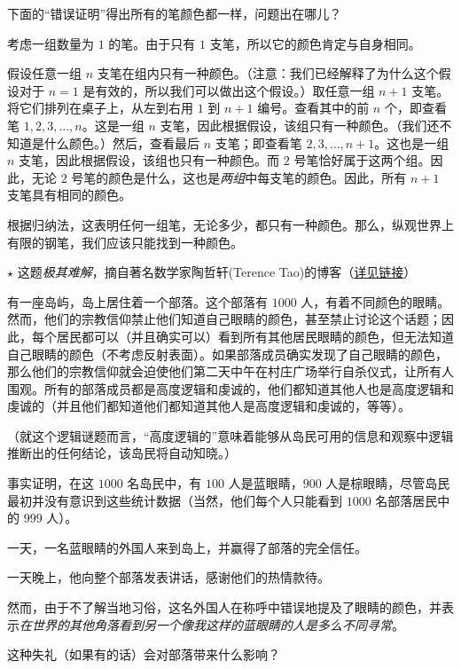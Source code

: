 \clearpage

\begin{exercise}
    下面的“错误证明”得出所有的笔颜色都一样，问题出在哪儿？
    \begin{spoof}
        考虑一组数量为 $1$ 的笔。由于只有 $1$ 支笔，所以它的颜色肯定与自身相同。

        假设任意一组 $n$ 支笔在组内只有一种颜色。（注意：我们已经解释了为什么这个假设对于 $n = 1$ 是有效的，所以我们可以做出这个假设。）取任意一组 $n + 1$ 支笔。将它们排列在桌子上，从左到右用 $1$ 到 $n + 1$ 编号。查看其中的前 $n$ 个，即查看笔 $1,2,3, \dots , n$。这是一组 $n$ 支笔，因此根据假设，该组只有一种颜色。（我们还不知道是什么颜色。）然后，查看最后 $n$ 支笔；即查看笔 $2,3, \dots ,n+1$。这也是一组 $n$ 支笔，因此根据假设，该组也只有一种颜色。而 $2$ 号笔恰好属于这两个组。因此，无论 $2$ 号笔的颜色是什么，这也是\textit{两组}中每支笔的颜色。因此，所有 $n+1$ 支笔具有相同的颜色。

        根据归纳法，这表明任何一组笔，无论多少，都只有一种颜色。那么，纵观世界上有限的钢笔，我们应该只能找到一种颜色。
    \end{spoof}
\end{exercise}

\begin{exercise}
    $\star$ 这题\textit{极其难解}，摘自著名数学家陶哲轩(Terence Tao)的博客（\href{https://terrytao.wordpress.com/2011/04/07/the-blue-eyed-islanders-puzzle-repost/}{详见链接}）

    有一座岛屿，岛上居住着一个部落。这个部落有 $1000$ 人，有着不同颜色的眼睛。然而，他们的宗教信仰禁止他们知道自己眼睛的颜色，甚至禁止讨论这个话题；因此，每个居民都可以（并且确实可以）看到所有其他居民眼睛的颜色，但无法知道自己眼睛的颜色（不考虑反射表面）。如果部落成员确实发现了自己眼睛的颜色，那么他们的宗教信仰就会迫使他们第二天中午在村庄广场举行自杀仪式，让所有人围观。所有的部落成员都是高度逻辑和虔诚的，他们都知道其他人也是高度逻辑和虔诚的（并且他们都知道他们都知道其他人是高度逻辑和虔诚的，等等）。

    （就这个逻辑谜题而言，“高度逻辑的”意味着能够从岛民可用的信息和观察中逻辑推断出的任何结论，该岛民将自动知晓。）

    事实证明，在这 $1000$ 名岛民中，有 $100$ 人是蓝眼睛，$900$ 人是棕眼睛，尽管岛民最初并没有意识到这些统计数据（当然，他们每个人只能看到 $1000$ 名部落居民中的 $999$ 人）。

    一天，一名蓝眼睛的外国人来到岛上，并赢得了部落的完全信任。

    一天晚上，他向整个部落发表讲话，感谢他们的热情款待。

    然而，由于不了解当地习俗，这名外国人在称呼中错误地提及了眼睛的颜色，并表示\textit{在世界的其他角落看到另一个像我这样的蓝眼睛的人是多么不同寻常}。

    这种失礼（如果有的话）会对部落带来什么影响？
\end{exercise}